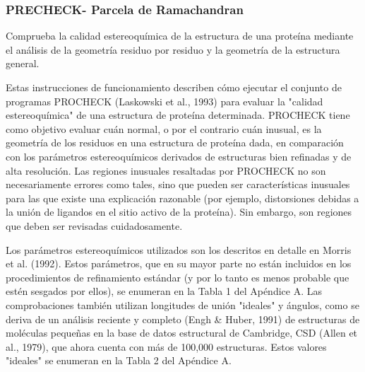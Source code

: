 \documentclass[11pt, letterpaper, spanish]{article}
\begin{document}
{{{\subsubsection{PRECHECK- Parcela de Ramachandran}
\par{Comprueba la calidad estereoquímica de la estructura de una proteína mediante el análisis de la geometría residuo por residuo y la geometría de la estructura general.}
\par{Estas instrucciones de funcionamiento describen cómo ejecutar el conjunto de programas PROCHECK (Laskowski et al., 1993) para evaluar la "calidad estereoquímica" de una estructura de proteína determinada. PROCHECK tiene como objetivo evaluar cuán normal, o por el contrario cuán inusual, es la geometría de los residuos en una estructura de proteína dada, en comparación con los parámetros estereoquímicos derivados de estructuras bien refinadas y de alta resolución. Las regiones inusuales resaltadas por PROCHECK no son necesariamente errores como tales, sino que pueden ser características inusuales para las que existe una explicación razonable (por ejemplo, distorsiones debidas a la unión de ligandos en el sitio activo de la proteína). Sin embargo, son regiones que deben ser revisadas cuidadosamente.}
\par{Los parámetros estereoquímicos utilizados son los descritos en detalle en Morris et al. (1992). Estos parámetros, que en su mayor parte no están incluidos en los procedimientos de refinamiento estándar (y por lo tanto es menos probable que estén sesgados por ellos), se enumeran en la Tabla 1 del Apéndice A. Las comprobaciones también utilizan longitudes de unión "ideales" y ángulos, como se deriva de un análisis reciente y completo (Engh & Huber, 1991) de estructuras de moléculas pequeñas en la base de datos estructural de Cambridge, CSD (Allen et al., 1979), que ahora cuenta con más de 100,000 estructuras. Estos valores "ideales" se enumeran en la Tabla 2 del Apéndice A.}
}}}
\end{document}

